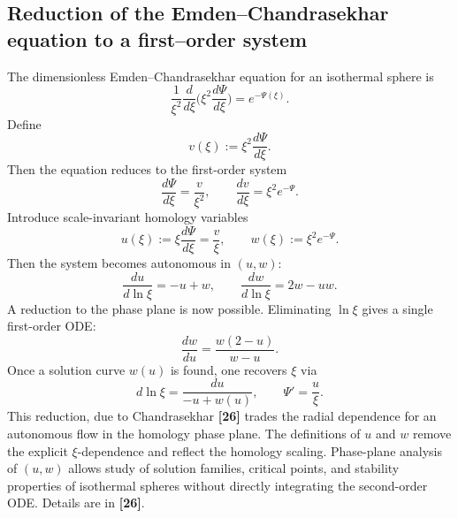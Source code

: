 \documentclass[12pt,a4paper]{article}
\numberwithin{equation}{section}
\begin{document}
\subsection{Reduction of the Emden--Chandrasekhar equation to a first--order system}
The dimensionless Emden--Chandrasekhar equation for an isothermal sphere is
\begin{equation}
\frac{1}{\xi^{2}}\frac{d}{d\xi}\!\Big(\xi^{2}\frac{d\Psi}{d\xi}\Big)=e^{-\Psi(\xi)}.
\end{equation}
Define
\begin{equation}
v(\xi) := \xi^{2} \frac{d\Psi}{d\xi}.
\end{equation}
Then the equation reduces to the first-order system
\begin{equation}
\frac{d\Psi}{d\xi} = \frac{v}{\xi^{2}}, \qquad \frac{dv}{d\xi} = \xi^{2} e^{-\Psi}.
\end{equation}
Introduce scale-invariant homology variables
\begin{equation}
u(\xi) := \xi \frac{d\Psi}{d\xi} = \frac{v}{\xi}, \qquad
w(\xi) := \xi^{2} e^{-\Psi}.
\end{equation}
Then the system becomes autonomous in $(u,w)$:
\begin{equation}
\frac{du}{d\ln\xi} = -u + w, \qquad
\frac{dw}{d\ln\xi} = 2w - u w.
\end{equation}
A reduction to the phase plane is now possible. Eliminating $\ln\xi$ gives a single first-order ODE:
\begin{equation}
\frac{dw}{du} = \frac{w(2-u)}{w-u}.
\end{equation}
Once a solution curve $w(u)$ is found, one recovers $\xi$ via
\begin{equation}
d\ln\xi = \frac{du}{-u + w(u)}, \qquad \Psi' = \frac{u}{\xi}.
\end{equation}
This reduction, due to Chandrasekhar \textbf{[26]} trades the radial dependence for an autonomous flow in the homology phase plane. The definitions of $u$ and $w$ remove the explicit $\xi$-dependence and reflect the homology scaling. Phase-plane analysis of $(u,w)$ allows study of solution families, critical points, and stability properties of isothermal spheres without directly integrating the second-order ODE. Details are in \textbf{[26]}.
\end{document}

